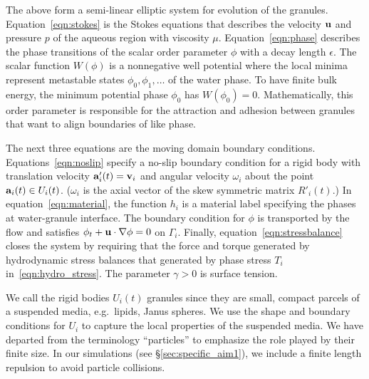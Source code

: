 The above form a semi-linear elliptic system for evolution of the
granules. Equation~\eqref{eqn:stokes} is the Stokes equations that
describes the velocity $\uu$ and pressure $p$ of the aqueous region with
viscosity $\mu$. Equation~\eqref{eqn:phase} describes the phase
transitions of the scalar order parameter $\phi$ with a decay length
$\epsilon$. The scalar function $W(\phi)$ is a nonnegative well
potential where the local minima represent metastable states $\phi_0,
\phi_1,\ldots$ of the water phase. To have finite bulk energy, the
minimum potential phase $\phi_0$ has $W(\phi_0) = 0$. Mathematically,
this order parameter is responsible for the attraction and adhesion
between granules that want to align boundaries of like phase.

The next three equations are the moving domain boundary conditions.
Equations~\eqref{eqn:noslip} specify a no-slip boundary condition for a
rigid body with translation velocity $\aa'_i(t) = \vv_i$ and angular
velocity $\omega_i$ about the point $\aa_i(t) \in U_i(t)$. ($\omega_i$
is the axial vector of the skew symmetric matrix $R'_i(t)$.) In
equation~\eqref{eqn:material}, the function $h_i$ is a material label
specifying the phases at water-granule interface. The boundary condition
for $\phi$ is transported by the flow and satisfies $\phi_t + \uu \cdot
\nabla \phi = 0$ on $\Gamma_i$. Finally,
equation~\eqref{eqn:stressbalance} closes the system by requiring that
the force and torque generated by hydrodynamic stress balances that
generated by phase stress $T_i$ in~\eqref{eqn:hydro_stress}. The
parameter $\gamma > 0$ is surface tension. 

We call the rigid bodies $U_i(t)$ granules since they are small, compact
parcels of a suspended media, e.g.~lipids, Janus spheres. We use the
shape and boundary conditions for $U_i$ to capture the local properties
of the suspended media. We have departed from the terminology
``particles'' to emphasize the role played by their finite size. In our
simulations (see \S\ref{sec:specific_aim1}), we include a finite length
repulsion to avoid particle collisions.

